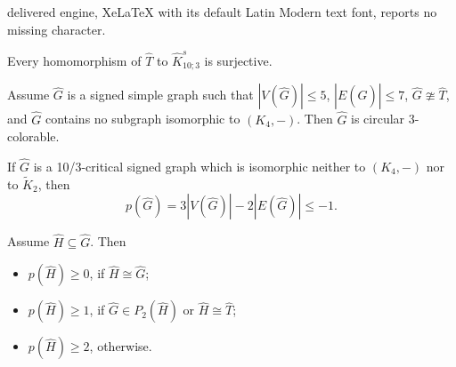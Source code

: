 \documentclass[10pt,a4paper]{amsart}
\begin{document}
delivered engine, XeLaTeX with its default Latin Modern text font, reports no missing character.
	\begin{lemma}\label{lem:T}
		Every homomorphism of $\widehat{T}$ to $\widehat{K}^s_{10;3}$ is surjective.  
	\end{lemma}

	\begin{lemma}\label{lem:3-colorable}
		Assume $\widehat{G}$ is a signed simple graph such that $|V(\widehat{G})|\leq 5$,  $|E(\widehat{G})|\leq 7$, $\widehat{G}\ncong\widehat{T}$, and $\widehat{G}$ contains no subgraph isomorphic to $(K_4,-)$. Then $\widehat{G}$ is circular 3-colorable. 
	\end{lemma}

\begin{theorem}\label{thm:main}
	If $\widehat{G}$ is a 10/3-critical signed graph which is isomorphic neither to $(K_4,-)$ nor to $\widetilde{K}_2$, then $$p(\widehat{G})=3|V(\widehat{G})|-2|E(\widehat{G})|\leq -1.$$
\end{theorem}

\begin{lemma}\label{lem:key}
	Assume $\widehat{H}\subseteq \widehat{G}$. Then 
	\begin{itemize}
		\item[(I)] $p(\widehat{H})\ge 0$, if $\widehat{H} \cong \widehat{G}$;
		\item[(II)] $p(\widehat{H})\ge 1$, if $\widehat{G}\in P_2(\widehat{H})$ or 
		$\widehat{H}\cong \widehat{T}$;
		\item[(III)] $p(\widehat{H})\ge 2$, otherwise.
	\end{itemize}
\end{lemma}
\end{document}
